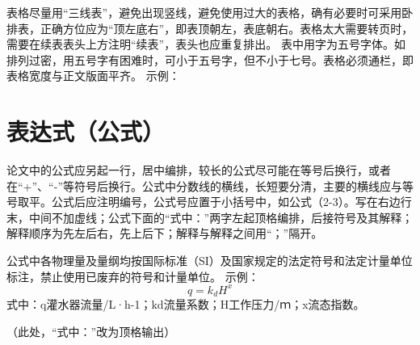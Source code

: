 表格尽量用“三线表”，避免出现竖线，避免使用过大的表格，确有必要时可采用卧排表，正确方位应为“顶左底右”，即表顶朝左，表底朝右。表格太大需要转页时，需要在续表表头上方注明“续表”，表头也应重复排出。
表中用字为五号字体。如排列过密，用五号字有困难时，可小于五号字，但不小于七号。表格必须通栏，即表格宽度与正文版面平齐。
示例：
\begin{table}[htp]
    \centering
    \label{tab:demo}    
\end{table}
\section{表达式（公式）}
论文中的公式应另起一行，居中编排，较长的公式尽可能在等号后换行，或者在“+”、“-”等符号后换行。公式中分数线的横线，长短要分清，主要的横线应与等号取平。公式后应注明编号，公式号应置于小括号中，如公式（2-3）。写在右边行末，中间不加虚线；公式下面的“式中：”两字左起顶格编排，后接符号及其解释；解释顺序为先左后右，先上后下；解释与解释之间用“；”隔开。

公式中各物理量及量纲均按国际标准（SI）及国家规定的法定符号和法定计量单位标注，禁止使用已废弃的符号和计量单位。
示例：
\begin{equation}
\label{eq:demo}
q=k_dH^x
\end{equation}
式中：q\cdash 灌水器流量/L·h-1；kd\cdash 流量系数；H\cdash 工作压力/ｍ；x\cdash 流态指数。 

（此处，“式中：”改为顶格输出）

